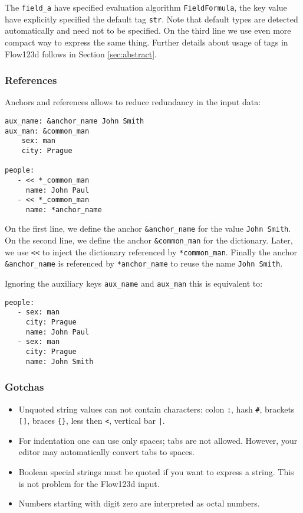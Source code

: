 The \verb'field_a' have specified evaluation algorithm \verb'FieldFormula', the key value have explicitly specified the default tag \verb'str'.
Note that default types are detected automatically and need not to be specified. On the third line we use even more compact way to 
express the same thing. Further details about usage of tags in Flow123d follows in Section \ref{sec:abstract}.

\subsubsection{References}
Anchors and references allows to reduce redundancy in the input data:
\begin{verbatim}
aux_name: &anchor_name John Smith
aux_man: &common_man
    sex: man
    city: Prague
    
people:
   - << *_common_man
     name: John Paul
   - << *_common_man
     name: *anchor_name
\end{verbatim}
On the first line, we define the anchor \verb'&anchor_name' for the value \verb'John Smith'. On the second line, 
we define the anchor \verb'&common_man' for the dictionary. Later, we use \verb'<<' to inject the dictionary 
referenced by \verb'*common_man'. Finally the anchor \verb'&anchor_name' is referenced by \verb'*anchor_name' to reuse the 
name \verb'John Smith'.

Ignoring the auxiliary keys \verb'aux_name' and \verb'aux_man' this is equivalent to:
\begin{verbatim}
people:
   - sex: man
     city: Prague
     name: John Paul
   - sex: man
     city: Prague
     name: John Smith
\end{verbatim}


\subsubsection{Gotchas}
\begin{itemize}
 \item Unquoted string values can not contain characters: colon \verb':', hash \verb'#', 
 brackets \verb'[]', braces \verb'{}', less then \verb'<', vertical bar \verb'|'.
 \item For indentation one can use only spaces; tabs are not allowed. However, your editor may automatically convert tabs to spaces.
 \item Boolean special strings must be quoted if you want to express a string. This is not problem for the Flow123d input.
 \item Numbers starting with digit zero are interpreted as octal numbers. 
\end{itemize}

